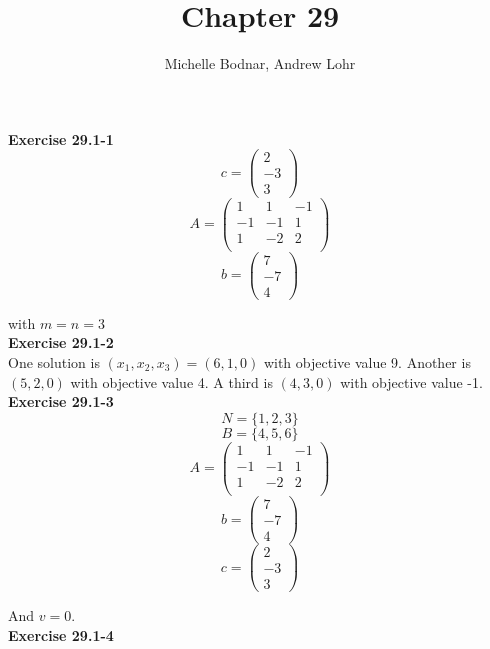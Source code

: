 \documentclass{article}
\title{Chapter 29}
\author{Michelle Bodnar, Andrew Lohr}
\begin{document}
\maketitle
\noindent\textbf{Exercise 29.1-1}\\

\[
c= \left(\begin{array}{c}2\\-3\\3\end{array}\right)
\]
\[
A = \left(\begin{array}{ccc}
1&1&-1\\
-1&-1&1\\
1&-2&2\\
\end{array}\right)
\]
\[
b= \left(\begin{array}{c}7\\-7\\4\end{array}\right)
\]

with $m=n=3$\\

\noindent\textbf{Exercise 29.1-2}\\

One solution is $(x_1,x_2,x_3) = (6,1,0)$ with objective value 9.  Another is $(5,2,0)$ with objective value 4.  A third is $(4,3,0)$ with objective value -1. \\

\noindent\textbf{Exercise 29.1-3}\\


\[
N = \{1,2,3\}
\]
\[
B = \{4,5,6\}
\]
\[
A = \left(\begin{array}{ccc}
1&1&-1\\
-1&-1&1\\
1&-2&2\\
\end{array}\right)
\]
\[
b= \left(\begin{array}{c}7\\-7\\4\end{array}\right)
\]
\[
c= \left(\begin{array}{c}2\\-3\\3\end{array}\right)
\]

And $v=0$.\\

\noindent\textbf{Exercise 29.1-4}\\
\end{document}

